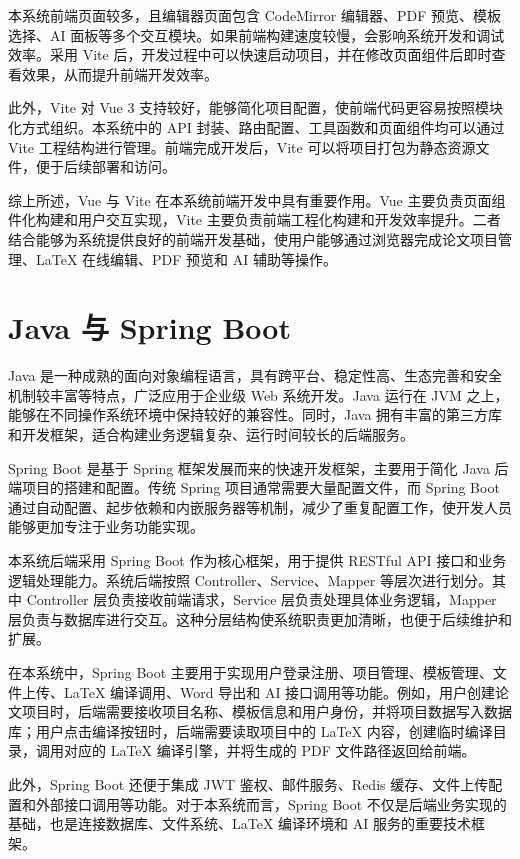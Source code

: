 \documentclass{xduugthesis}
\begin{document}
本系统前端页面较多，且编辑器页面包含 CodeMirror 编辑器、PDF 预览、模板选择、AI 面板等多个交互模块。如果前端构建速度较慢，会影响系统开发和调试效率。采用 Vite 后，开发过程中可以快速启动项目，并在修改页面组件后即时查看效果，从而提升前端开发效率。

此外，Vite 对 Vue 3 支持较好，能够简化项目配置，使前端代码更容易按照模块化方式组织。本系统中的 API 封装、路由配置、工具函数和页面组件均可以通过 Vite 工程结构进行管理。前端完成开发后，Vite 可以将项目打包为静态资源文件，便于后续部署和访问。

综上所述，Vue 与 Vite 在本系统前端开发中具有重要作用。Vue 主要负责页面组件化构建和用户交互实现，Vite 主要负责前端工程化构建和开发效率提升。二者结合能够为系统提供良好的前端开发基础，使用户能够通过浏览器完成论文项目管理、LaTeX 在线编辑、PDF 预览和 AI 辅助等操作。

\section{Java 与 Spring Boot}
Java 是一种成熟的面向对象编程语言，具有跨平台、稳定性高、生态完善和安全机制较丰富等特点，广泛应用于企业级 Web 系统开发。Java 运行在 JVM 之上，能够在不同操作系统环境中保持较好的兼容性。同时，Java 拥有丰富的第三方库和开发框架，适合构建业务逻辑复杂、运行时间较长的后端服务。

Spring Boot 是基于 Spring 框架发展而来的快速开发框架，主要用于简化 Java 后端项目的搭建和配置。传统 Spring 项目通常需要大量配置文件，而 Spring Boot 通过自动配置、起步依赖和内嵌服务器等机制，减少了重复配置工作，使开发人员能够更加专注于业务功能实现。

本系统后端采用 Spring Boot 作为核心框架，用于提供 RESTful API 接口和业务逻辑处理能力。系统后端按照 Controller、Service、Mapper 等层次进行划分。其中 Controller 层负责接收前端请求，Service 层负责处理具体业务逻辑，Mapper 层负责与数据库进行交互。这种分层结构使系统职责更加清晰，也便于后续维护和扩展。

在本系统中，Spring Boot 主要用于实现用户登录注册、项目管理、模板管理、文件上传、LaTeX 编译调用、Word 导出和 AI 接口调用等功能。例如，用户创建论文项目时，后端需要接收项目名称、模板信息和用户身份，并将项目数据写入数据库；用户点击编译按钮时，后端需要读取项目中的 LaTeX 内容，创建临时编译目录，调用对应的 LaTeX 编译引擎，并将生成的 PDF 文件路径返回给前端。

此外，Spring Boot 还便于集成 JWT 鉴权、邮件服务、Redis 缓存、文件上传配置和外部接口调用等功能。对于本系统而言，Spring Boot 不仅是后端业务实现的基础，也是连接数据库、文件系统、LaTeX 编译环境和 AI 服务的重要技术框架。
\end{document}
